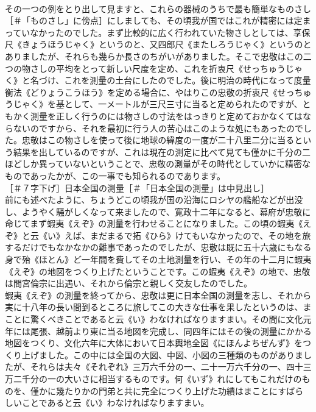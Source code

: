 \documentclass[8pt]{extreport}
\begin{document}
\begin{CJK}{UTF8}{min}
\\	その一つの例をとり出して見ますと、これらの器械のうちで最も簡単なものさし［＃「ものさし」に傍点］にしましても、その頃我が国ではこれが精密には定まっていなかったのでした。まず比較的に広く行われていた物さしとしては、享保尺《きょうほうじゃく》というのと、又四郎尺《またしろうじゃく》というのとありましたが、それらも幾らか長さのちがいがありました。そこで忠敬はこの二つの物さしの平均をとって新しい尺度を定め、これを折衷尺《せっちゅうじゃく》と名づけ、これを測量の土台にしたのでした。後に明治の時代になって度量衡法《どりょうこうほう》を定める場合に、やはりこの忠敬の折衷尺《せっちゅうじゃく》を基として、一メートルが三尺三寸に当ると定められたのですが、ともかく測量を正しく行うのには物さしの寸法をはっきりと定めておかなくてはならないのですから、それを最初に行う人の苦心はこのような処にもあったのでした。忠敬はこの物さしを使って後に地球の緯度の一度が二十八里二分に当るという結果を出しているのですが、これは現在の測定に比べて見ても僅かに千分の二ほどしか異っていないということで、忠敬の測量がその時代としていかに精密なものであったかが、この一事でも知られるのであります。
\\	［＃７字下げ］日本全国の測量［＃「日本全国の測量」は中見出し］
\\	前にも述べたように、ちょうどこの頃我が国の沿海にロシヤの艦船などが出没し、ようやく騒がしくなって来ましたので、寛政十二年になると、幕府が忠敬に命じてまず蝦夷《えぞ》の測量を行わせることになりました。この頃の蝦夷《えぞ》と云《い》えば、まだまるで拓《ひら》けてもいなかったので、その地を旅するだけでもなかなかの難事であったのでしたが、忠敬は既に五十六歳にもなる身で殆《ほとん》ど一年間を費してその土地測量を行い、その年の十二月に蝦夷《えぞ》の地図をつくり上げたということです。この蝦夷《えぞ》の地で、忠敬は間宮倫宗に出遇い、それから倫宗と親しく交友したのでした。
\\	蝦夷《えぞ》の測量を終ってから、忠敬は更に日本全国の測量を志し、それから実に十八年の長い間到るところに旅してこの大きな仕事を果したというのは、まことに驚くべきことであると云《い》わなければなりますまい。その間に文化元年には尾張、越前より東に当る地図を完成し、同四年にはその後の測量にかかる地図をつくり、文化六年に大体において日本輿地全図《にほんよちぜんず》をつくり上げました。この中には全国の大図、中図、小図の三種類のものがありましたが、それらは夫々《それぞれ》三万六千分の一、二十一万六千分の一、四十三万二千分の一の大いさに相当するものです。何《いず》れにしてもこれだけのものを、僅かに幾たりかの門弟と共に完全につくり上げた功績はまことにすばらしいことであると云《い》わなければなりますまい。

\end{CJK}
\end{document}
